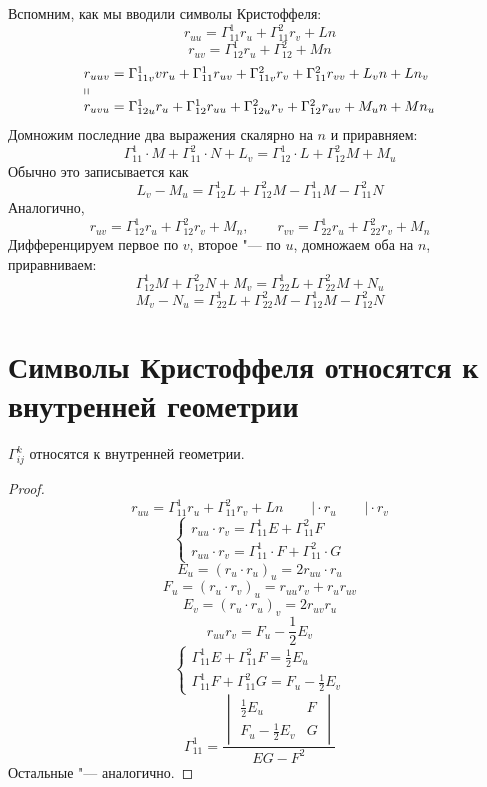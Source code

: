 Вспомним, как мы вводили символы Кристоффеля:
$$ r_{uu} = \Gamma_{11}^1 r_u + \Gamma_{11}^2 r_v + Ln $$
$$ r_{uv} = \Gamma_{12}^1r_u + \Gamma_{12}^2 + Mn $$
$$
\begin{array}l
	r_{uuv} = \Gamma_{11v}^1vr_u + \Gamma_{11}^1r_{uv} + \Gamma_{11v}^2r_v + \Gamma_{11}^2r_{vv} + L_vn + Ln_v \\
	\shortparallel \\
	r_{uvu} = \Gamma_{12u}^1r_u + \Gamma_{12}^1r_{uu} + \Gamma_{12u}^2r_v + \Gamma_{12}^2r_{uv} + M_un + Mn_u
\end{array} $$
Домножим последние два выражения скалярно на $ n $ и приравняем:
$$ \Gamma_{11}^1 \cdot M + \Gamma_{11}^2 \cdot N + L_v = \Gamma_{12}^1 \cdot L + \Gamma_{12}^2M + M_u $$
Обычно это записывается как
$$ \boxed{L_v - M_u = \Gamma_{12}^1L + \Gamma_{12}^2M - \Gamma_{11}^1M - \Gamma_{11}^2N} $$
Аналогично,
$$ r_{uv} = \Gamma_{12}^1r_u + \Gamma_{12}^2r_v + M_n, \qquad r_{vv} = \Gamma_{22}^1r_u + \Gamma_{22}^2r_v + M_n $$
Дифференцируем первое по $ v $, второе "--- по $ u $, домножаем оба на $ n $, приравниваем:
$$ \Gamma_{12}^1M + \Gamma_{12}^2N + M_v = \Gamma_{22}^1L + \Gamma_{22}^2M + N_u $$
$$ \boxed{M_v - N_u = \Gamma_{22}^1L + \Gamma_{22}^2M - \Gamma_{12}^1M - \Gamma_{12}^2N} $$

\section{Символы Кристоффеля относятся к внутренней геометрии}

\begin{theorem}
	$ \Gamma_{ij}^k $ относятся к внутренней геометрии.
\end{theorem}

\begin{proof}
	$$ r_{uu} = \Gamma_{11}^1r_u + \Gamma_{11}^2 r_v + Ln \qquad \bigg| \cdot r_u \qquad \bigg| \cdot r_v $$
	$$
	\begin{cases}
		r_{uu} \cdot r_v = \Gamma_{11}^1E + \Gamma_{11}^2F \\
		r_{uu} \cdot r_v = \Gamma_{11}^1 \cdot F + \Gamma_{11}^2 \cdot G
	\end{cases} $$
	$$ E_u = (r_u \cdot r_u)_u = 2r_{uu} \cdot r_u $$
	$$ F_u = (r_u \cdot r_v)_u = r_{uu} r_v + r_ur_{uv} $$
	$$ E_v = (r_u \cdot r_u)_v = 2r_{uv}r_u $$
	$$ r_{uu}r_v = F_u - \frac12 E_v $$
	$$
	\begin{cases}
		\Gamma_{11}^1E + \Gamma_{11}^2F = \frac12 E_u \\
		\Gamma_{11}^1F + \Gamma_{11}^2G = F_u - \frac12 E_v
	\end{cases} $$
	$$ \boxed{\Gamma_{11}^1 = \frac{
			\begin{vmatrix}
				\frac12E_u & F \\
				F_u - \frac12 E_v & G
			\end{vmatrix}}{EG - F^2}} $$
	Остальные "--- аналогично.
\end{proof}

